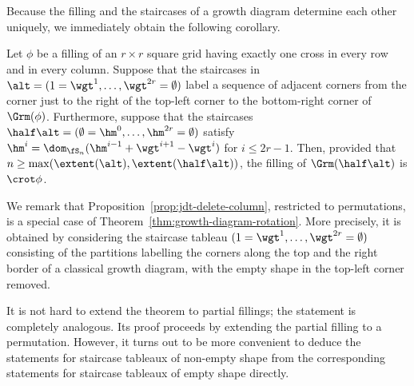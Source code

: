 Because the filling and the staircases of a growth diagram determine
each other uniquely, we immediately obtain the following corollary.
\begin{coro}\label{cor:growth-diagram-rotation}
 Let $\phi$ be a filling of an $r\times r$ square grid having
 exactly one cross in every row and in every column. Suppose that
 the staircases in $\alt=(1=\wgt^1,\dots,\wgt^{2r}=\emptyset)$ label
 a sequence of adjacent corners from the corner just to the right of
 the top-left corner to the bottom-right corner of $\Grm(\phi)$.
 Furthermore, suppose that the staircases
 $\half\alt=(\emptyset=\hm^0,\dots,\hm^{2r}=\emptyset)$ satisfy
 $\hm^i = \dom_{\fS_n}(\hm^{i-1}+\wgt^{i+1}-\wgt^i)$ for
 $i\leq 2r-1$. Then, provided that
 $n\geq\max(\extent(\alt),\extent(\half\alt))$, the filling of
 $\Grm(\half\alt)$ is $\crot\phi$.
%
%
\end{coro}
We remark that
%
Proposition~\ref{prop:jdt-delete-column}, restricted to permutations,
is a special case of Theorem~\ref{thm:growth-diagram-rotation}. More
precisely, it is obtained by considering the staircase tableau
$(1=\wgt^1,\dots,\wgt^{2r}=\emptyset)$ consisting of the partitions
labelling the corners along the top and the right border of a
classical growth diagram, with the empty shape in the top-left corner
removed.

It is not hard to extend the theorem to partial fillings; the
statement is completely analogous. Its proof proceeds by extending
the partial filling to a permutation. However, it turns out to be
more convenient to deduce the statements for staircase tableaux of
non-empty shape from the corresponding statements for staircase
tableaux of empty shape directly.


